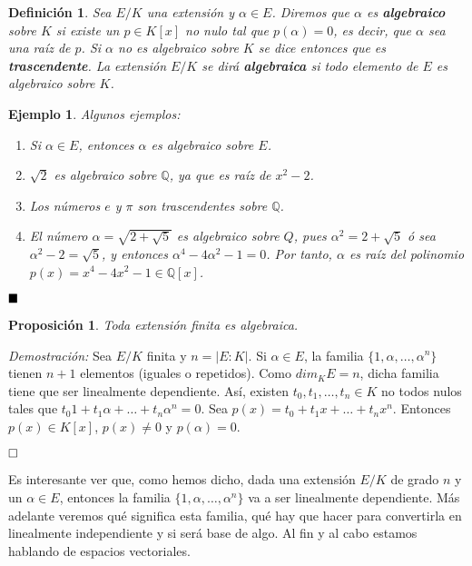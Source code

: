 \documentclass[12pt]{article}
\newtheorem{proposition}[theorem]{Proposición}
\newtheorem{definition}[theorem]{Definición}
\newtheorem{example}{Ejemplo}[theorem]
\begin{document}
\begin{definition} Sea  $E/K$ una extensión y $\alpha \in E$. Diremos que $\alpha$ es \textbf{algebraico} sobre $K$ si existe un $p \in K[x]$ no nulo tal que $p(\alpha) = 0$, es decir, que $\alpha$ sea una raíz de $p$. Si $\alpha$ no es algebraico sobre $K$ se dice entonces que es \textbf{trascendente}. La extensión $E/K$ se dirá \textbf{algebraica} si todo elemento de $E$ es algebraico sobre $K$.
\end{definition}
\begin{example} Algunos ejemplos: \begin{enumerate}
\item Si $\alpha \in E$, entonces $\alpha$ es algebraico sobre $E$.
\item $\sqrt{2}$ es algebraico sobre $\mathbb{Q}$, ya que es raíz de $x^{2}-2$.
\item Los números $e$ y $\pi$ son trascendentes  sobre $\mathbb{Q}$.
\item El número $\alpha = \sqrt{2 + \sqrt{5}}$ es algebraico sobre $Q$, pues $\alpha^{2} = 2 + \sqrt{5}$ ó sea $\alpha^{2}-2 = \sqrt{5}$, y entonces $\alpha^{4}-4\alpha^{2}-1 = 0$. Por tanto, $\alpha$ es raíz del polinomio $p(x) = x^{4}-4x^{2}-1 \in \mathbb{Q}[x]$.
\end{enumerate}
\end{example}

$\hfill \blacksquare$
\begin{proposition} Toda extensión finita es algebraica.
\end{proposition}
\emph{Demostración: } Sea $E/K$ finita y $n = |E:K|$. Si $\alpha \in E$, la familia $\lbrace 1, \alpha, \ldots, \alpha^{n} \rbrace$ tienen $n+1$ elementos (iguales o repetidos). Como $dim_{K} E = n$, dicha familia tiene que ser linealmente dependiente. Así, existen $t_{0}, t_{1}, \ldots, t_{n} \in K$ no todos nulos tales que $t_{0}1 + t_{1}\alpha + \ldots + t_{n}\alpha^{n} = 0$. Sea $p(x) = t_{0} + t_{1}x + \ldots + t_{n}x^{n}$. Entonces $p(x) \in K[x]$, $p(x) \neq 0$ y $p(\alpha) = 0.$

$\hfill \square$

Es interesante ver que, como hemos dicho, dada una extensión $E/K$ de grado $n$ y un $\alpha \in E$, entonces la familia $\lbrace 1, \alpha, \ldots, \alpha^{n} \rbrace$ va a ser linealmente dependiente. Más adelante veremos qué significa esta familia, qué hay que hacer para convertirla en linealmente independiente y si será base de algo. Al fin y al cabo estamos hablando de espacios vectoriales.
\end{document}

